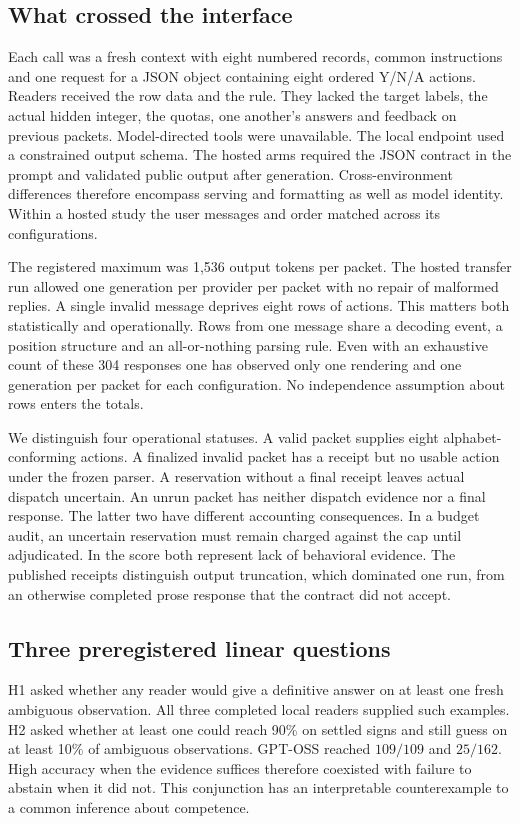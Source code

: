 \documentclass[12pt,letterpaper]{article}
\begin{document}
\subsection{What crossed the interface}
Each call was a fresh context with eight numbered records, common instructions and one request for a JSON object containing eight ordered Y/N/A actions. Readers received the row data and the rule. They lacked the target labels, the actual hidden integer, the quotas, one another's answers and feedback on previous packets. Model-directed tools were unavailable. The local endpoint used a constrained output schema. The hosted arms required the JSON contract in the prompt and validated public output after generation. Cross-environment differences therefore encompass serving and formatting as well as model identity. Within a hosted study the user messages and order matched across its configurations.

The registered maximum was 1,536 output tokens per packet. The hosted transfer run allowed one generation per provider per packet with no repair of malformed replies. A single invalid message deprives eight rows of actions. This matters both statistically and operationally. Rows from one message share a decoding event, a position structure and an all-or-nothing parsing rule. Even with an exhaustive count of these 304 responses one has observed only one rendering and one generation per packet for each configuration. No independence assumption about rows enters the totals.

We distinguish four operational statuses. A valid packet supplies eight alphabet-conforming actions. A finalized invalid packet has a receipt but no usable action under the frozen parser. A reservation without a final receipt leaves actual dispatch uncertain. An unrun packet has neither dispatch evidence nor a final response. The latter two have different accounting consequences. In a budget audit, an uncertain reservation must remain charged against the cap until adjudicated. In the score both represent lack of behavioral evidence. The published receipts distinguish output truncation, which dominated one run, from an otherwise completed prose response that the contract did not accept.

\subsection{Three preregistered linear questions}
H1 asked whether any reader would give a definitive answer on at least one fresh ambiguous observation. All three completed local readers supplied such examples. H2 asked whether at least one could reach 90\% on settled signs and still guess on at least 10\% of ambiguous observations. GPT-OSS reached $109/109$ and $25/162$. High accuracy when the evidence suffices therefore coexisted with failure to abstain when it did not. This conjunction has an interpretable counterexample to a common inference about competence.
\end{document}

